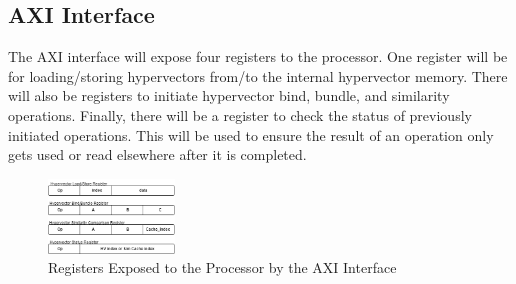 \documentclass[conference]{IEEEtran}
\begin{document}
\subsection{AXI Interface}

The AXI interface will expose four registers to the processor. One register will be for loading/storing hypervectors from/to the internal hypervector memory. There will also be registers to initiate hypervector bind, bundle, and similarity operations. Finally, there will be a register to check the status of previously initiated operations. This will be used to ensure the result of an operation only gets used or read elsewhere after it is completed.

\begin{figure}[H]
    \centering
    \includegraphics[width=0.3\textwidth]{img/axi-interface.png}
    \caption{Registers Exposed to the Processor by the AXI Interface}
    \label{fig:axi-interface}
\end{figure}


{}
\end{document}
